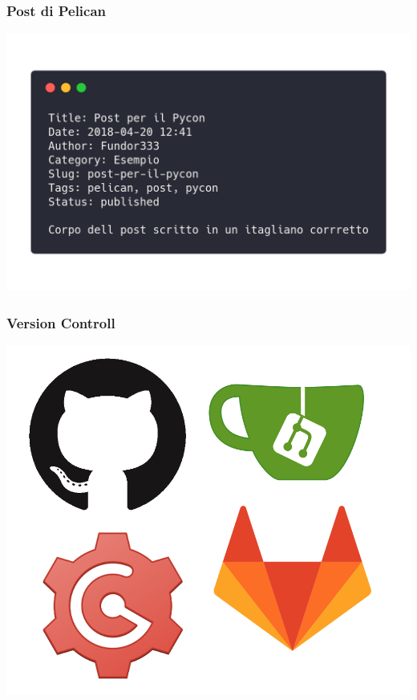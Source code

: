 \begin{frame}
	\frametitle{Post di Pelican}
	\begin{center}
		\includegraphics[scale=0.2]{img/post.png}
	\end{center}
\end{frame}

\begin{frame}
	\frametitle{Version Controll}
	\begin{center}
		\includegraphics[scale=0.2]{img/versioncontroll.png}
	\end{center}
\end{frame}

